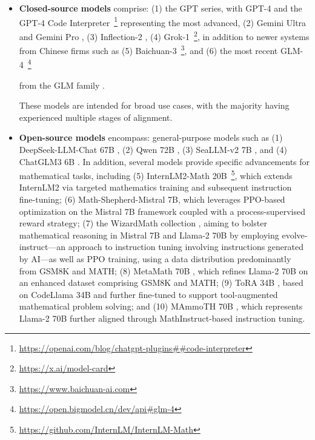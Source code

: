 \begin{itemize}[topsep=0pt]
\begin{itemize}[topsep=0pt]
    \item \textbf{Closed-source models} comprise: (1) the GPT series, with GPT-4 \citep{gpt4} and the GPT-4 Code Interpreter~\footnote{\url{https://openai.com/blog/chatgpt-plugins\#\#code-interpreter}} representing the most advanced, (2) Gemini Ultra and Gemini Pro \citep{gemini}, (3) Inflection-2 \citep{inflection-2}, (4) Grok-1~\footnote{\url{https://x.ai/model-card}}, in addition to newer systems from Chinese firms such as (5) Baichuan-3~\footnote{\url{https://www.baichuan-ai.com}}, and (6) the most recent GLM-4~\footnote{\url{https://open.bigmodel.cn/dev/api\#glm-4}}

    from the GLM family \citep{glm}.

These models are intended for broad use cases, with the majority having experienced multiple stages of alignment.
    \item \textbf{Open-source models} encompass: general-purpose models such as (1) DeepSeek-LLM-Chat 67B \citep{deepseek-llm}, (2) Qwen 72B \citep{qwen}, (3) SeaLLM-v2 7B \citep{seallm}, and (4) ChatGLM3 6B \citep{chatglm3}. In addition, several models provide specific advancements for mathematical tasks, including (5) InternLM2-Math 20B~\footnote{\url{https://github.com/InternLM/InternLM-Math}}, which extends InternLM2 via targeted mathematics training and subsequent instruction fine-tuning; (6) Math-Shepherd-Mistral 7B, which leverages PPO-based optimization \citep{schulman2017proximal} on the Mistral 7B framework \citep{mistral} coupled with a process-supervised reward strategy; (7) the WizardMath collection \citep{wizardmath}, aiming to bolster mathematical reasoning in Mistral 7B and Llama-2 70B \citep{llama2} by employing evolve-instruct—an approach to instruction tuning involving instructions generated by AI—as well as PPO training, using a data distribution predominantly from GSM8K and MATH; (8) MetaMath 70B \citep{metamath}, which refines Llama-2 70B on an enhanced dataset comprising GSM8K and MATH; (9) ToRA 34B \cite{tora}, based on CodeLlama 34B and further fine-tuned to support tool-augmented mathematical problem solving; and (10) MAmmoTH 70B \citep{MathInstruct}, which represents Llama-2 70B further aligned through MathInstruct-based instruction tuning.
\end{itemize}


\end{itemize}
